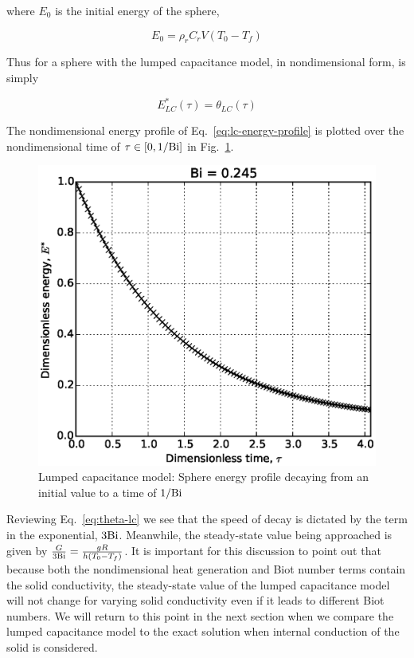 where $E_0$ is the initial energy of the sphere,

\begin{equation}
    E_0=\rho_rC_rV(T_0-T_f)
\end{equation}

Thus for a sphere with the lumped capacitance model, in nondimensional form, is simply

\begin{equation}\label{eq:lc-energy-profile}
	E^*_{LC}(\tau) = \theta_{LC}(\tau)
\end{equation}

The nondimensional energy profile of Eq.~\ref{eq:lc-energy-profile} is plotted over the nondimensional time of $\tau \in [0,1/\mathrm{Bi}]$ in Fig.~\ref{fig:LC-sphere-in-fluid}. 

\begin{figure}[ht]
	\centering
		\includegraphics[width=\singleimagewidth]{chapters/figures/LC-sphere-in-fluid}
	\caption[Lumped Capacitance energy profile]{Lumped capacitance model: Sphere energy profile decaying from an initial value to a time of $1/\mathrm{Bi}$}
	\label{fig:LC-sphere-in-fluid}
\end{figure}

Reviewing Eq.~\ref{eq:theta-lc} we see that the speed of decay is dictated by the term in the exponential, $3\mathrm{Bi}$. Meanwhile, the steady-state value being approached is given by $\frac{G}{3\mathrm{Bi}} = \frac{gR}{h(T_0 - T_f)}$. It is important for this discussion to point out that because both the nondimensional heat generation and Biot number terms contain the solid conductivity, the steady-state value of the lumped capacitance model will not change for varying solid conductivity even if it leads to different Biot numbers. We will return to this point in the next section when we compare the lumped capacitance model to the exact solution when internal conduction of the solid is considered.



